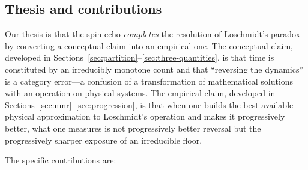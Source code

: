 \documentclass[11pt,a4paper]{article}
\theoremstyle{thmstyle}
\theoremstyle{definition}
\theoremstyle{remark}
\begin{document}
\subsection{Thesis and contributions}
\label{sec:thesis}

Our thesis is that the spin echo \emph{completes} the resolution of
Loschmidt's paradox by converting a conceptual claim into an empirical
one. The conceptual claim, developed in
Sections~\ref{sec:partition}--\ref{sec:three-quantities}, is that time
is constituted by an irreducibly monotone count and that ``reversing the
dynamics'' is a category error---a confusion of a transformation of
mathematical solutions with an operation on physical systems. The
empirical claim, developed in
Sections~\ref{sec:nmr}--\ref{sec:progression}, is that when one builds
the best available physical approximation to Loschmidt's operation and
makes it progressively better, what one measures is not progressively
better reversal but the progressively sharper exposure of an irreducible
floor.

The specific contributions are:
\end{document}
